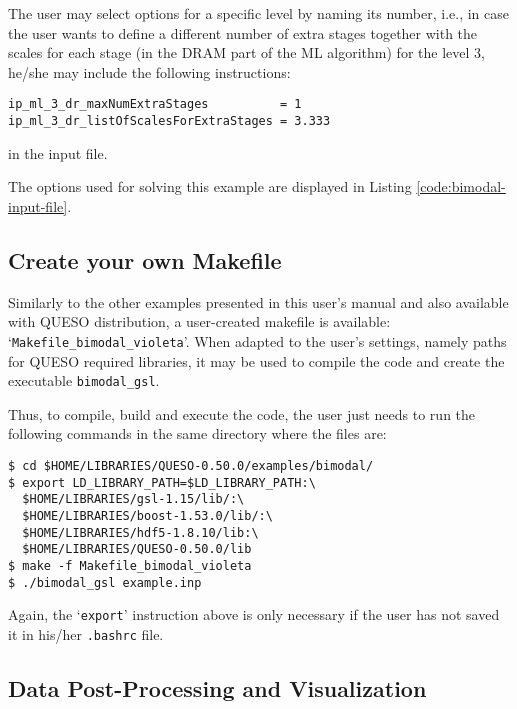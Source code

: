 The user may select options for a specific level by naming its number, i.e., in case the user wants to define a different number of extra stages together with the scales for each stage (in the DRAM part of the ML algorithm) for the level 3, he/she may include the following instructions:
\begin{lstlisting}
ip_ml_3_dr_maxNumExtraStages          = 1
ip_ml_3_dr_listOfScalesForExtraStages = 3.333
\end{lstlisting}
in the input file.


The options used for solving this example are displayed in Listing \ref{code:bimodal-input-file}. 





\subsection{Create your own Makefile}\label{sec:bimodal-makefile}

Similarly to the other examples presented in this user's manual and also available with QUESO distribution, a user-created makefile is available: `\texttt{Makefile\_bimodal\_violeta}'. When adapted to the user's settings, namely paths for  QUESO required libraries, it may be used to compile the code and create the executable \verb+bimodal_gsl+. 

Thus, to compile, build and execute the code, the user just needs to run the following commands in the same directory where the files are:
\begin{lstlisting}
$ cd $HOME/LIBRARIES/QUESO-0.50.0/examples/bimodal/
$ export LD_LIBRARY_PATH=$LD_LIBRARY_PATH:\
  $HOME/LIBRARIES/gsl-1.15/lib/:\
  $HOME/LIBRARIES/boost-1.53.0/lib/:\
  $HOME/LIBRARIES/hdf5-1.8.10/lib:\
  $HOME/LIBRARIES/QUESO-0.50.0/lib 
$ make -f Makefile_bimodal_violeta 
$ ./bimodal_gsl example.inp
\end{lstlisting}

Again, the `\verb+export+' instruction above is only necessary if the user has not saved it in his/her \verb+.bashrc+ file. 


\subsection{Data Post-Processing and Visualization}\label{sec:bimodal-results}



